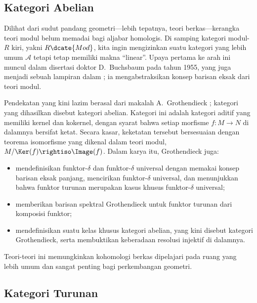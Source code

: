 \subsection*{Kategori Abelian}

Dilihat dari sudut pandang geometri---lebih tepatnya, teori berkas---kerangka
teori modul belum memadai bagi aljabar homologis. Di samping kategori
modul-$R$ kiri, yakni $R\dcate{Mod}$, kita ingin mengizinkan suatu
kategori yang lebih umum $\mathcal{A}$ tetapi tetap memiliki makna ``linear''.
Upaya pertama ke arah ini muncul dalam disertasi
doktor D.\ Buchsbaum pada tahun 1955, yang juga menjadi sebuah lampiran
dalam \cite{CE56}; ia mengabstraksikan konsep barisan eksak dari teori
modul.

Pendekatan yang kini lazim berasal dari makalah A.\ Grothendieck
\cite{Gr57}; kategori yang dihasilkan disebut kategori abelian. Kategori
ini adalah kategori aditif yang memiliki kernel dan kokernel, dengan
syarat bahwa setiap morfisme $f: M \to N$ di dalamnya bersifat ketat.
Secara kasar, keketatan tersebut bersesuaian dengan teorema isomorfisme
yang dikenal dalam teori modul,
$M/\Ker(f) \rightiso \Image(f)$. Dalam karya itu, Grothendieck juga:
\begin{itemize}
	\item mendefinisikan funktor-$\delta$ dan funktor-$\delta$ universal
	dengan memakai konsep barisan eksak panjang, mencirikan funktor-$\delta$
	universal, dan menunjukkan bahwa funktor turunan merupakan
	kasus khusus funktor-$\delta$ universal;
	\item memberikan barisan spektral Grothendieck untuk funktor turunan
	dari komposisi funktor;
	\item mendefinisikan suatu kelas khusus kategori abelian, yang kini
	disebut kategori Grothendieck, serta membuktikan keberadaan resolusi
	injektif di dalamnya.
\end{itemize}

Teori-teori ini memungkinkan kohomologi berkas dipelajari pada ruang yang
lebih umum dan sangat penting bagi perkembangan geometri.

\subsection*{Kategori Turunan}

